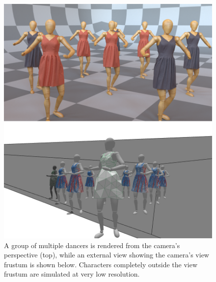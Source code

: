 \documentclass[10pt,journal,compsoc,twoside]{TexInputs/IEEEtran}
\begin{document}
\begin{figure}[t]
    \centering
    \includegraphics[width=1.0\columnwidth]{crowd/crowd}
    \caption{A group of multiple dancers is rendered from the camera's perspective (top), while 
	an external view showing the camera's view frustum is shown below. Characters
      completely outside the view frustum are simulated at very low resolution.}
    \label{fig:crowd}
\end{figure}

\begin{table}[t]
    \caption{Statistics and timing numbers for the examples. Non-adaptive simulations use a fixed
    high-resolution mesh. 
	Adaptive simulations use the unmodified scheme implemented in ARCSim. %
	View-dependent simulations use the method described in this paper.
	The adaptive simulations are used as a baseline for comparison.  
	The non-adaptive mesh resolution was selected to match the visual quality of the 
	adaptive simulations.
}
\label{table:timings}
    \centering
    \resizebox{\textwidth}{!}{}
\end{table}
\end{document}
